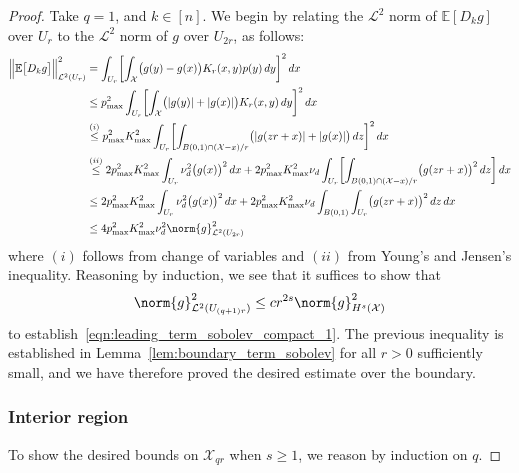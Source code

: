 \documentclass{article}
\newcommand{\abs}[1]{\left \lvert #1 \right \rvert}
\newcommand{\1}{\mathbf{1}}
\newcommand{\Xset}{\mathcal{X}}
\newcommand{\Leb}{\mathcal{L}}
\newcommand{\Ebb}{\mathbb{E}}
\theoremstyle{alden}
\theoremstyle{aldenthm}
\theoremstyle{definition}
\theoremstyle{remark}
\begin{document}
\begin{proof}
	Take $q = 1$, and $k \in [n]$. We begin by relating the $\Leb^2$ norm of $\Ebb[D_kg]$ over $U_r$ to the $\Leb^2$ norm of $g$ over $U_{2r}$, as follows:
	\begin{align*}
	\Bigl\|\Ebb\bigl[D_kg\bigr]\Bigr\|_{\Leb^2(U_r)}^2 & = \int_{U_r} \biggl[\int_{\Xset} \bigl(g(y) - g(x)\bigr)K_r(x,y) p(y) \,dy \biggr]^2 \,dx \\
	& \leq p_{\max}^2 \int_{U_r} \biggl[\int_{\Xset} \bigl(\abs{g(y)} +  \abs{g(x)}\bigr)K_r(x,y) \,dy \biggr]^2 \,dx \\
	& \overset{(i)}{\leq}  p_{\max}^2 K_{\max}^2 \int_{U_r} \biggl[\int_{B(0,1) \cap (\Xset - x)/r} \bigl(\abs{g(zr + x)} +  \abs{g(x)}\bigr)\,dz \biggr]^2 \,dx \\
	& \overset{(ii)}{\leq} 2 p_{\max}^2 K_{\max}^2 \int_{U_r} \nu_d^2 \bigl(g(x)\bigr)^2 \,dx + 2 p_{\max}^2 K_{\max}^2 \nu_d \int_{U_r}\biggl[\int_{B(0,1) \cap (\Xset - x)/r} \bigl(g(zr + x)\bigr)^2\,dz\biggr] \,dx \\
	& \leq 2 p_{\max}^2 K_{\max}^2 \int_{U_r} \nu_d^2 \bigl(g(x)\bigr)^2 \,dx + 2 p_{\max}^2 K_{\max}^2 \nu_d \int_{B(0,1)} \int_{U_r} \bigl(g(zr + x)\bigr)^2\,dz \,dx \\
	& \leq 4 p_{\max}^2 K_{\max}^2 \nu_d^2 \norm{g}_{\Leb^2(U_{2r})}^2
	\end{align*}
	where $(i)$ follows from change of variables and $(ii)$ from Young's and Jensen's inequality. Reasoning by induction, we see that it suffices to show that
	\begin{equation*}
	\norm{g}_{\Leb^2(U_{(q + 1)r})}^2 \leq c r^{2s} \norm{g}_{H^s(\Xset)}^2
	\end{equation*}
	to establish~\eqref{eqn:leading_term_sobolev_compact_1}. The previous inequality is established in Lemma~\ref{lem:boundary_term_sobolev} for all $r > 0$ sufficiently small, and we have therefore proved the desired estimate over the boundary. 
	
	\subsubsection{Interior region}
	
	To show the desired bounds on $\Xset_{qr}$ when $s \geq 1$, we reason by induction on $q$.
	

\end{proof}
\end{document}

